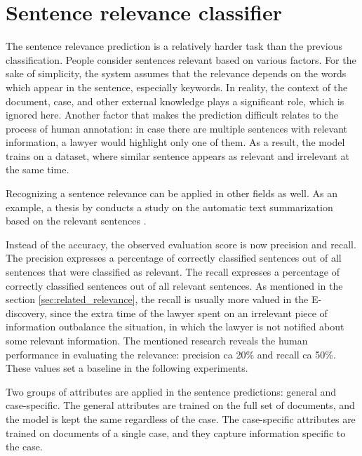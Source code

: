 \documentclass[
  digital, %
  notable,   %
  nolof,     %
  nolot,     %
]{fithesis3}
\begin{document}
\section{Sentence relevance classifier}
\label{sec:sentence-classifier}
The sentence relevance prediction is a relatively harder task than the previous classification.
People consider sentences relevant based on various factors.
For the sake of simplicity, the system assumes that the relevance depends on the words which appear in the sentence, especially keywords.
In reality, the context of the document, case, and other external knowledge plays a significant role, which is ignored here.
Another factor that makes the prediction difficult relates to the process of human annotation: in case there are multiple sentences with relevant information, a lawyer would highlight only one of them.
As a result, the model trains on a dataset, where similar sentence appears as relevant and irrelevant at the same time.

Recognizing a sentence relevance can be applied in other fields as well.
As an example, a thesis  by \citeauthor{Machovec2015thesis} conducts a study on the automatic text summarization based on the relevant sentences \cite{Machovec2015thesis}.

Instead of the accuracy, the observed evaluation score is now precision and recall.
The precision expresses a percentage of correctly classified sentences out of all sentences that were classified as relevant.
The recall expresses a percentage of correctly classified sentences out of all relevant sentences.
As mentioned in the section \ref{sec:related_relevance}, the recall is usually more valued in the E-discovery, since the extra time of the lawyer spent on an irrelevant piece of information outbalance the situation, in which the lawyer is not notified about some relevant information.
The mentioned research reveals the human performance in evaluating the relevance: precision ca 20\% and recall ca 50\%.
These values set a baseline in the following experiments.

Two groups of attributes are applied in the sentence predictions: general and case-specific. 
The general attributes are trained on the full set of documents, and the model is kept the same regardless of the case.
The case-specific attributes are trained on documents of a single case, and they capture information specific to the case.
\end{document}

